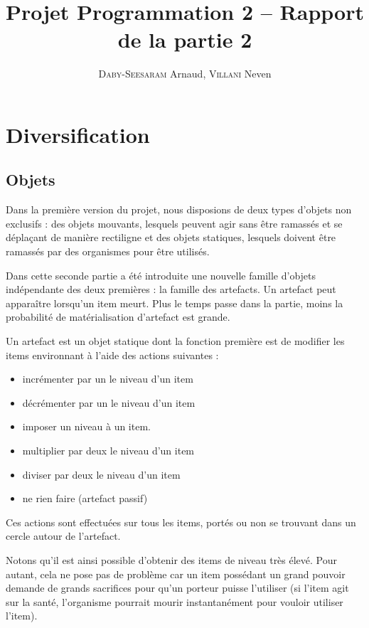 \documentclass[a4paper,french]{article}
\title{Projet Programmation 2 -- Rapport de la partie 2}
\author{\textsc{Daby-Seesaram} Arnaud, \textsc{Villani} Neven}
\date{}
\begin{document}
\maketitle

\section{Diversification}

\subsection{Objets}
Dans la première version du projet, nous disposions de deux types d'objets non
exclusifs : des objets mouvants, lesquels peuvent agir sans être ramassés et se
déplaçant de manière rectiligne et des objets statiques, lesquels doivent être
ramassés par des organismes pour être utilisés.

Dans cette seconde partie a été introduite une nouvelle famille d'objets
indépendante des deux premières : la famille des artefacts.
Un artefact peut apparaître lorsqu'un item meurt. Plus le temps passe dans la
partie, moins la probabilité de matérialisation d'artefact est grande.

Un artefact est un objet statique dont la fonction première est de modifier les
items environnant à l'aide des actions suivantes :
\begin{itemize}
    \item incrémenter par un le niveau d'un item
    \item décrémenter par un le niveau d'un item
    \item imposer un niveau à un item.
    \item multiplier par deux le niveau d'un item
    \item diviser par deux le niveau d'un item
    \item ne rien faire (artefact passif)
\end{itemize}

Ces actions sont effectuées sur tous les items, portés ou non se trouvant dans
un cercle autour de l'artefact.

Notons qu'il est ainsi possible d'obtenir des items de niveau très élevé. Pour
autant, cela ne pose pas de problème car un item possédant un grand pouvoir
demande de grands sacrifices pour qu'un porteur puisse l'utiliser (si l'item
agit sur la santé, l'organisme pourrait mourir instantanément pour vouloir
utiliser l'item).

\medskip
\end{document}
